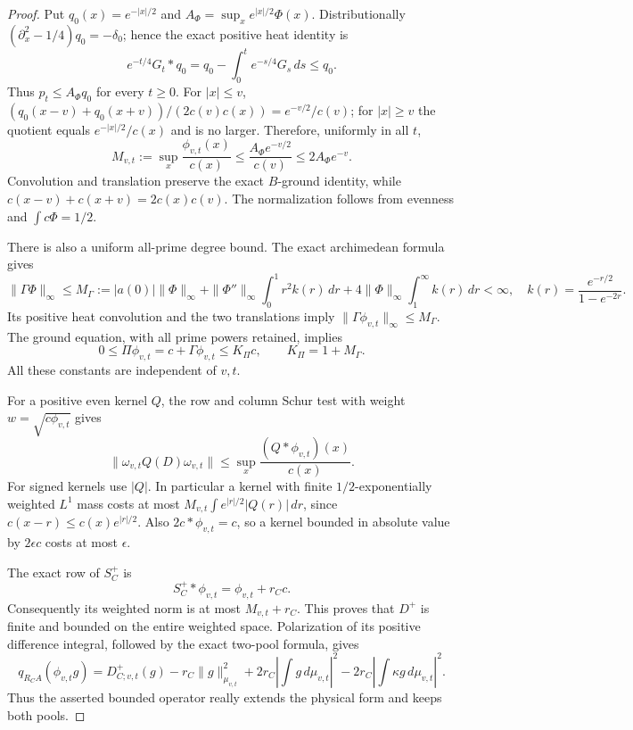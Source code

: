 \documentclass[11pt]{article}
\theoremstyle{remark}\newtheorem{remark}[theorem]{Remark}
\begin{document}
\begin{proof}
Put \(q_0(x)=e^{-|x|/2}\) and
\(A_\Phi=\sup_x e^{|x|/2}\Phi(x)\).
Distributionally \((\partial_x^2-1/4)q_0=-\delta_0\);
hence the exact positive heat identity is
\[
 e^{-t/4}G_t*q_0
   =q_0-\int_0^t e^{-s/4}G_s\,ds\le q_0 .
 \tag{RGC28}
\]
Thus \(p_t\le A_\Phi q_0\) for every \(t\ge0\).
For \(|x|\le v\),
\((q_0(x-v)+q_0(x+v))/(2c(v)c(x))=e^{-v/2}/c(v)\);
for \(|x|\ge v\) the quotient equals \(e^{-|x|/2}/c(x)\)
and is no larger. Therefore, uniformly in all \(t\),
\[
 M_{v,t}:=\sup_x\frac{\phi_{v,t}(x)}{c(x)}
       \le \frac{A_\Phi e^{-v/2}}{c(v)}
       \le 2A_\Phi e^{-v}.
 \tag{RGC29}
\]
Convolution and translation preserve the exact \(B\)-ground
identity, while \(c(x-v)+c(x+v)=2c(x)c(v)\).
The normalization follows from evenness and
\(\int c\Phi=1/2\).

There is also a uniform all-prime degree bound. The exact
archimedean formula gives
\[
 \|\Gamma\Phi\|_\infty\le M_\Gamma:=
 |a(0)|\|\Phi\|_\infty
 +\|\Phi''\|_\infty\int_0^1r^2k(r)\,dr
 +4\|\Phi\|_\infty\int_1^\infty k(r)\,dr<\infty,
 \quad k(r)=\frac{e^{-r/2}}{1-e^{-2r}}.
 \tag{RGC30}
\]
Its positive heat convolution and the two translations imply
\(\|\Gamma\phi_{v,t}\|_\infty\le M_\Gamma\).
The ground equation, with all prime powers retained, implies
\[
 0\le\Pi\phi_{v,t}=c+\Gamma\phi_{v,t}
        \le K_\Pi c,\qquad K_\Pi=1+M_\Gamma .
 \tag{RGC31}
\]
All these constants are independent of \(v,t\).

For a positive even kernel \(Q\), the row and column Schur test
with weight \(w=\sqrt{c\phi_{v,t}}\) gives
\[
 \|\omega_{v,t}Q(D)\omega_{v,t}\|
      \le \sup_x\frac{(Q*\phi_{v,t})(x)}{c(x)}.
 \tag{RGC32}
\]
For signed kernels use \(|Q|\). In particular a kernel with
finite \(1/2\)-exponentially weighted \(L^1\) mass costs at most
\(M_{v,t}\int e^{|r|/2}|Q(r)|\,dr\), since
\(c(x-r)\le c(x)e^{|r|/2}\).
Also \(2c*\phi_{v,t}=c\), so a kernel bounded in absolute
value by \(2\epsilon c\) costs at most \(\epsilon\).

The exact row of \(S_C^+\) is
\[
 S_C^+*\phi_{v,t}=\phi_{v,t}+r_Cc .
 \tag{RGC33}
\]
Consequently its weighted norm is at most \(M_{v,t}+r_C\).
This proves that \(D^+\) is finite and bounded on the entire
weighted space. Polarization of its positive difference integral,
followed by the exact two-pool formula, gives
\[
 q_{R_CA}(\phi_{v,t}g)=D_{C;v,t}^+(g)
       -r_C\|g\|_{\mu_{v,t}}^2
       +2r_C\left|\int g\,d\mu_{v,t}\right|^2
       -2r_C\left|\int\kappa g\,d\mu_{v,t}\right|^2 .
 \tag{RGC34}
\]
Thus the asserted bounded operator really extends the physical
form and keeps both pools.


\end{proof}
\end{document}
